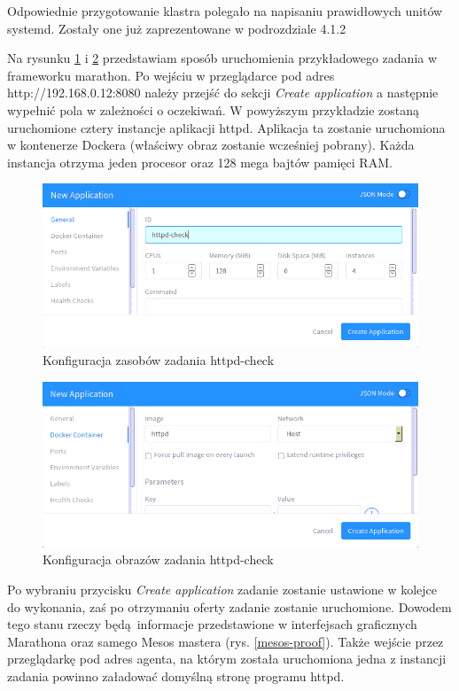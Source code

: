 \documentclass[10pt,a4paper,titlepage,twoside]{report}
\begin{document}
Odpowiednie przygotowanie klastra polegało na napisaniu prawidłowych unitów systemd. Zostały one już zaprezentowane w podrozdziale 4.1.2

Na rysunku \ref{marathon_example1} i \ref{marathon_example2} przedstawiam sposób uruchomienia przykładowego zadania w frameworku marathon.
Po wejściu w przeglądarce pod adres http://192.168.0.12:8080 należy przejść do sekcji \textit{Create application} a następnie wypełnić pola w zależności o oczekiwań. W powyższym przykładzie zostaną uruchomione cztery instancje aplikacji httpd. Aplikacja ta zostanie uruchomiona w kontenerze Dockera (właściwy obraz zostanie wcześniej pobrany). Każda instancja otrzyma jeden procesor oraz 128 mega bajtów pamięci RAM.
\begin{figure}[!h]
	\centering
	\includegraphics[scale=0.6]{pics/Selection_659.png}
	\caption{Konfiguracja zasobów zadania httpd-check}
	\label{marathon_example1}
\end{figure}
\newpage
\begin{figure}[!t]
	\centering
	\includegraphics[scale=0.6]{pics/Selection_660.png}
	\caption{Konfiguracja obrazów zadania httpd-check}
	\label{marathon_example2}
\end{figure}
\newpage
Po wybraniu przycisku \textit{Create application} zadanie zostanie ustawione w kolejce do wykonania, zaś po otrzymaniu oferty zadanie zostanie uruchomione. Dowodem tego stanu rzeczy będą informacje przedstawione w interfejsach graficznych Marathona oraz samego Mesos mastera (rys. \ref{mesos-proof}). Także wejście przez przeglądarkę pod adres agenta, na którym została uruchomiona jedna z instancji zadania powinno załadować domyślną stronę programu httpd.
\end{document}
